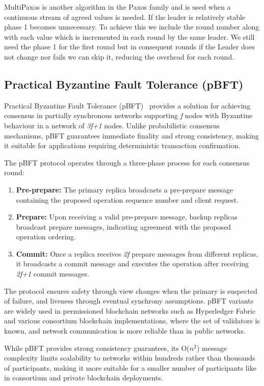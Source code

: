MultiPaxos is another algorithm in the Paxos family and is used when a
continuous stream of agreed values is needed.
If the leader is relatively stable phase 1 becomes unnecessary. To achieve this
we include the round number along with each value which is incremented in each round
by the same leader. We still need the phase 1 for the first round but in
consequent rounds if the Leader does not change nor fails we can skip it, reducing
the overhead for each round.

\subsection{Practical Byzantine Fault Tolerance (pBFT)}\label{sub:pbft}

Practical Byzantine Fault Tolerance (pBFT)~\cite{pbft} provides a solution for achieving
consensus in partially synchronous networks supporting \textit{f} nodes with Byzantine behaviour
in a network of \textit{3f+1} nodes. Unlike probabilistic consensus
mechanisms, pBFT guarantees immediate finality and strong consistency, making
it suitable for applications requiring deterministic transaction confirmation.

The pBFT protocol operates through a three-phase process for each consensus round:
\begin{enumerate}
  \item \textbf{Pre-prepare:} The primary replica broadcasts a pre-prepare message
  containing the proposed operation sequence number and client request.
  \item \textbf{Prepare:} Upon receiving a valid pre-prepare message, backup replicas
  broadcast prepare messages, indicating agreement with the proposed operation ordering.
  \item \textbf{Commit:} Once a replica receives \textit{2f} prepare messages from different
  replicas, it broadcasts a commit message and executes the operation after receiving
  \textit{2f+1} commit messages.
\end{enumerate}

The protocol ensures safety through view changes when the primary is suspected
of failure, and liveness through eventual synchrony assumptions. pBFT variants
are widely used in permissioned blockchain networks such as Hyperledger Fabric~\cite{hyperledger_fabric}
and various consortium blockchain implementations, where the set of validators
is known, and network communication is more reliable than in public networks.

While pBFT provides strong consistency guarantees, its O($n^2$) message complexity
limits scalability to networks within hundreds rather than thousands of participants,
making it more suitable for a smaller number of participants like in 
consortium and private blockchain deployments.

